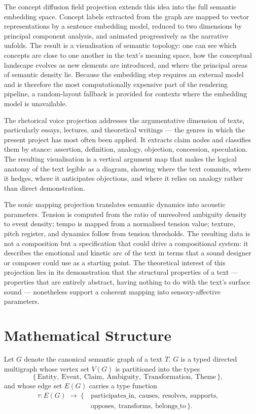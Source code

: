 \documentclass[12pt, a4paper]{article}
\begin{document}
The concept diffusion field projection extends this idea into the full semantic embedding space. Concept labels extracted from the graph are mapped to vector representations by a sentence embedding model, reduced to two dimensions by principal component analysis, and animated progressively as the narrative unfolds. The result is a visualisation of semantic topology: one can see which concepts are close to one another in the text's meaning space, how the conceptual landscape evolves as new elements are introduced, and where the principal areas of semantic density lie. Because the embedding step requires an external model and is therefore the most computationally expensive part of the rendering pipeline, a random-layout fallback is provided for contexts where the embedding model is unavailable.

The rhetorical voice projection addresses the argumentative dimension of texts, particularly essays, lectures, and theoretical writings — the genres in which the present project has most often been applied. It extracts claim nodes and classifies them by stance: assertion, definition, analogy, objection, concession, speculation. The resulting visualisation is a vertical argument map that makes the logical anatomy of the text legible as a diagram, showing where the text commits, where it hedges, where it anticipates objections, and where it relies on analogy rather than direct demonstration.

The sonic mapping projection translates semantic dynamics into acoustic parameters. Tension is computed from the ratio of unresolved ambiguity density to event density; tempo is mapped from a normalised tension value; texture, pitch register, and dynamics follow from tension thresholds. The resulting data is not a composition but a specification that could drive a compositional system: it describes the emotional and kinetic arc of the text in terms that a sound designer or composer could use as a starting point. The theoretical interest of this projection lies in its demonstration that the structural properties of a text — properties that are entirely abstract, having nothing to do with the text's surface sound — nonetheless support a coherent mapping into sensory-affective parameters.

\section{Mathematical Structure}

Let $G$ denote the canonical semantic graph of a text $T$. $G$ is a typed directed multigraph whose vertex set $V(G)$ is partitioned into the types
\[
\bigl\{\,\text{Entity},\ \text{Event},\ \text{Claim},\ \text{Ambiguity},\ \text{Transformation},\ \text{Theme}\,\bigr\},
\]
and whose edge set $E(G)$ carries a type function
\begin{align*}
\tau : E(G) \;\longrightarrow\; \bigl\{\,&\text{participates\_in},\ \text{causes},\ \text{resolves},\ \text{supports},\\
&\text{opposes},\ \text{transforms},\ \text{belongs\_to}\,\bigr\}.
\end{align*}
\end{document}
